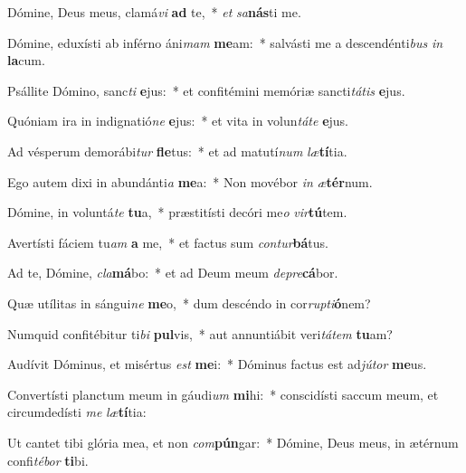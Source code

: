 \item Dómine, Deus meus, clamá\textit{vi} \textbf{ad} te,~* \textit{et} \textit{sa}\textbf{nás}ti me.
\item Dómine, eduxísti ab inférno áni\textit{mam} \textbf{me}am:~* salvásti me a descendénti\textit{bus} \textit{in} \textbf{la}cum.
\item Psállite Dómino, sanc\textit{ti} \textbf{e}jus:~* et confitémini memóriæ sancti\textit{tá}\textit{tis} \textbf{e}jus.
\item Quóniam ira in indignatió\textit{ne} \textbf{e}jus:~* et vita in volun\textit{tá}\textit{te} \textbf{e}jus.
\item Ad vésperum demorábi\textit{tur} \textbf{fle}tus:~* et ad matutí\textit{num} \textit{læ}\textbf{tí}tia.
\item Ego autem dixi in abundánti\textit{a} \textbf{me}a:~* Non movébor \textit{in} \textit{æ}\textbf{tér}num.
\item Dómine, in voluntá\textit{te} \textbf{tu}a,~* præstitísti decóri me\textit{o} \textit{vir}\textbf{tú}tem.
\item Avertísti fáciem tu\textit{am} \textbf{a} me,~* et factus sum \textit{con}\textit{tur}\textbf{bá}tus.
\item Ad te, Dómine, \textit{cla}\textbf{má}bo:~* et ad Deum meum \textit{de}\textit{pre}\textbf{cá}bor.
\item Quæ utílitas in sángui\textit{ne} \textbf{me}o,~* dum descéndo in cor\textit{rup}\textit{ti}\textbf{ó}nem?
\item Numquid confitébitur ti\textit{bi} \textbf{pul}vis,~* aut annuntiábit veri\textit{tá}\textit{tem} \textbf{tu}am?
\item Audívit Dóminus, et misértus \textit{est} \textbf{me}i:~* Dóminus factus est ad\textit{jú}\textit{tor} \textbf{me}us.
\item Convertísti planctum meum in gáudi\textit{um} \textbf{mi}hi:~* conscidísti saccum meum, et circumdedísti \textit{me} \textit{læ}\textbf{tí}tia:
\item Ut cantet tibi glória mea, et non \textit{com}\textbf{pún}gar:~* Dómine, Deus meus, in ætérnum confi\textit{té}\textit{bor} \textbf{ti}bi.
